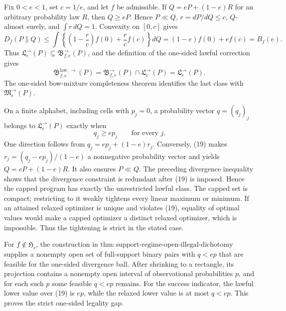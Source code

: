 Fix \(0<e<1\), set \(c=1/e\), and let \(f\) be admissible.  If \(Q=eP+(1-e)R\) for an arbitrary probability law \(R\), then \(Q\ge eP\).  Hence \(P\ll Q\), \(r=dP/dQ\le c\), \(Q\)-almost surely, and \(\int r\,dQ=1\).  Convexity on \([0,c]\) gives
\[
 D_f(P\|Q)
 \le\int\left\{\left(1-\frac rc\right)f(0)+\frac rc f(c)\right\}dQ
 =(1-e)f(0)+ef(c)=B_f(e).
\]
Thus \(\mathfrak L^{\to}_e(P)\subseteq\mathfrak B^{\to}_{f,e}(P)\), and the definition of the one-sided lawful correction gives
\[
 \mathfrak B^{\mathrm{law},\to}_{f,e}(P)
 =\mathfrak B^{\to}_{f,e}(P)\cap\mathfrak L^{\to}_e(P)
 =\mathfrak L^{\to}_e(P).
\]
The one-sided bow-mixture completeness theorem identifies the last class with \(\mathfrak M^{\to}_e(P)\).

On a finite alphabet, including cells with \(p_j=0\), a probability vector \(q=(q_j)_j\) belongs to \(\mathfrak L^{\to}_e(P)\) exactly when
\[
 q_j\ge ep_j\qquad\text{for every }j. \tag{19}
\]
One direction follows from \(q_j=ep_j+(1-e)r_j\).  Conversely, (19) makes \(r_j=(q_j-ep_j)/(1-e)\) a nonnegative probability vector and yields \(Q=eP+(1-e)R\).  It also ensures \(P\ll Q\).  The preceding divergence inequality shows that the divergence constraint is redundant after (19) is imposed.  Hence the capped program has exactly the unrestricted lawful class.  The capped set is compact; restricting to it weakly tightens every linear maximum or minimum.  If an attained relaxed optimizer is unique and violates (19), equality of optimal values would make a capped optimizer a distinct relaxed optimizer, which is impossible.  Thus the tightening is strict in the stated case.

For \(f\notin\mathfrak H_c\), the construction in \(\mathrm{thm:support\text{-}regime\text{-}open\text{-}illegal\text{-}dichotomy}\) supplies a nonempty open set of full-support binary pairs with \(q<ep\) that are feasible for the one-sided divergence ball.  After shrinking to a rectangle, its projection contains a nonempty open interval of observational probabilities \(p\), and for each such \(p\) some feasible \(q<ep\) remains.  For the success indicator, the lawful lower value over (19) is \(ep\), while the relaxed lower value is at most \(q<ep\).  This proves the strict one-sided legality gap.